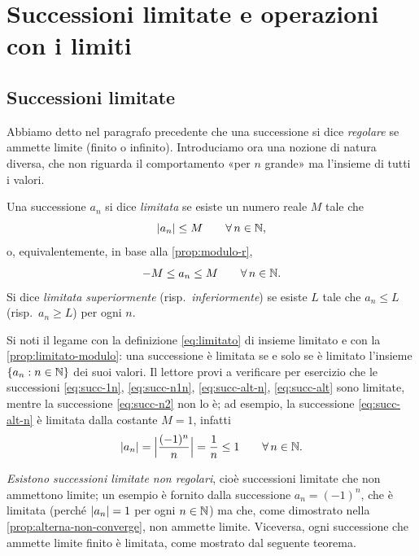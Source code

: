 \section{Successioni limitate e operazioni con i limiti}
\label{sec:operazioni-limiti}

\subsection{Successioni limitate}

Abbiamo detto nel paragrafo precedente che una successione si dice \emph{regolare} se
ammette limite (finito o infinito). Introduciamo ora una nozione di natura diversa, che
non riguarda il comportamento «per $n$ grande» ma l'insieme di tutti i valori.

\begin{definizione}
Una successione $a_{n}$ si dice \emph{limitata} se esiste un numero reale $M$ tale che
\begin{equation}\label{eq:succ-limitata}
  \lvert a_{n}\rvert\le M \qquad\forall\, n\in\mathbb{N},
\end{equation}
o, equivalentemente, in base alla \cref{prop:modulo-r},
\begin{equation}\label{eq:succ-limitata-2}
  -M\le a_{n}\le M \qquad\forall\, n\in\mathbb{N}.
\end{equation}
Si dice \emph{limitata superiormente} (risp.\ \emph{inferiormente}) se esiste $L$ tale che
$a_{n}\le L$ (risp.\ $a_{n}\ge L$) per ogni $n$.
\end{definizione}

Si noti il legame con la definizione \eqref{eq:limitato} di insieme limitato e con la
\cref{prop:limitato-modulo}: una successione è limitata se e solo se è limitato l'insieme
$\{a_{n} : n\in\mathbb{N}\}$ dei suoi valori. Il lettore provi a verificare per esercizio che le
successioni \eqref{eq:succ-1n}, \eqref{eq:succ-n1n}, \eqref{eq:succ-alt-n},
\eqref{eq:succ-alt} sono limitate, mentre la successione \eqref{eq:succ-n2} non lo è; ad
esempio, la successione \eqref{eq:succ-alt-n} è limitata dalla costante $M=1$, infatti
\[
  \lvert a_{n}\rvert=\Bigl|\frac{(-1)^{n}}{n}\Bigr|=\frac1n\le1 \qquad\forall\, n\in\mathbb{N} .
\]

\emph{Esistono successioni limitate non regolari}, cioè successioni limitate che non
ammettono limite; un esempio è fornito dalla successione $a_{n}=(-1)^{n}$, che è
limitata (perché $\lvert a_{n}\rvert=1$ per ogni $n\in\mathbb{N}$) ma che, come dimostrato nella
\cref{prop:alterna-non-converge}, non ammette limite. Viceversa, ogni successione che
ammette limite finito è limitata, come mostrato dal seguente teorema.

